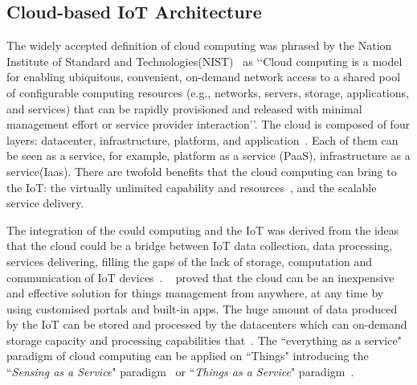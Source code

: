 \subsection{Cloud-based IoT Architecture}

The widely accepted definition of cloud computing was phrased by the Nation Institute of Standard and Technologies(NIST)~\citep{Mell:2012} as 
‘‘Cloud computing is a model for enabling ubiquitous, convenient, on-demand network access to a shared pool of configurable computing resources (e.g., networks, servers, storage, applications, and services) that can be rapidly provisioned and released with minimal management effort or service provider interaction’’.
The cloud is composed of four layers: datacenter, infrastructure, platform, and application~\citep{Zhang:2010}.
Each of them can be seen as a service, for example, platform as a service (PaaS), infrastructure as a service(Iaas).
There are twofold benefits that the cloud computing can bring to the IoT: the virtually unlimited capability and resources~\citep{Zhang:2010}, and the scalable service delivery.

The integration of the could computing and the IoT was derived from the ideas that the cloud could be a bridge between IoT data collection, data processing, services delivering, filling the gaps of the lack of storage, computation and communication of IoT devices~\citep{Botta:2016}.
~\cite{Rao:2012} proved that the cloud can be an inexpensive and effective solution for things management from anywhere, at any time by using customised portals and built-in apps.
The huge amount of data produced by the IoT can be stored and processed by the datacenters which can on-demand storage capacity and processing capabilities that~\citep{Parwekar:2011}.
The ``everything as a service" paradigm of cloud computing can be applied on ``Things" introducing the ``\textit{Sensing as a Service}" paradigm~\citep{Zaslavsky:2013} or ``\textit{Things as a Service}" paradigm~\citep{Christophe:2011}.

